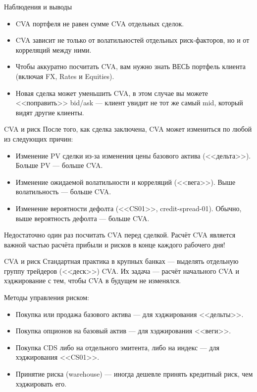 \documentclass{beamer}
\begin{document}
\begin{frame}{Наблюдения и выводы}
\begin{itemize}
\justifying
\item CVA портфеля не равен сумме CVA отдельных сделок.
\item CVA зависит не только от волатильностей отдельных риск-факторов, но и от корреляций между ними.
\item Чтобы аккуратно посчитать CVA, вам нужно знать ВЕСЬ портфель клиента (включая FX, Rates и Equities).
\item Новая сделка может уменьшить CVA, в этом случае вы можете <<поправить>> bid/ask --- клиент увидит не тот же самый mid, который видят другие клиенты.
\end{itemize}
\end{frame}



\begin{frame}{CVA и риск}
\justify
После того, как сделка заключена, CVA может измениться по любой из следующих причин:
\begin{itemize}
\justifying
\item Изменение PV сделки из-за изменения цены базового актива (<<дельта>>). Больше PV --- больше CVA.
\item Изменение ожидаемой волатильности и корреляций (<<вега>>). Выше волатильность --- больше CVA.
\item Изменение вероятности дефолта (<<CS01>>, credit-spread-01). Обычно, выше вероятность дефолта --- больше CVA.
\end{itemize}

\justify
Недостаточно один раз посчитать CVA перед сделкой. Расчёт CVA является важной частью расчёта прибыли и рисков в конце каждого рабочего дня!
\end{frame}



\begin{frame}{CVA и риск}
\justify
Стандартная практика в крупных банках --- выделять отдельную группу трейдеров (<<деск>>) CVA. Их задача --- расчёт начального CVA и хэджирование с тем, чтобы CVA в будущем не изменялся.

\vspace{\baselineskip}
Методы управления риском:
\begin{itemize}
\justifying
\item Покупка или продажа базового актива --- для хэджирования <<дельты>>.
\item Покупка опционов на базовый актив --- для хэджирования <<веги>>.
\item Покупка CDS либо на отдельного эмитента, либо на индекс --- для хэджирования <<CS01>>.
\item Принятие риска (warehouse) --- иногда дешевле принять кредитный риск, чем хэджировать его.
\end{itemize}
\end{frame}
\end{document}
